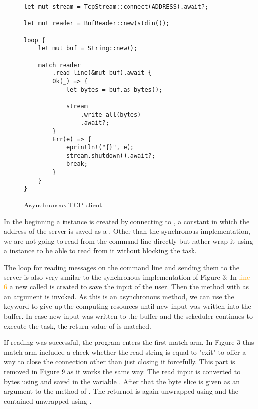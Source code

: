 \begin{figure}[ht]
    \begin{verbatim}
let mut stream = TcpStream::connect(ADDRESS).await?;

let mut reader = BufReader::new(stdin());

loop {
    let mut buf = String::new();

    match reader
        .read_line(&mut buf).await {
        Ok(_) => {
            let bytes = buf.as_bytes();

            stream
                .write_all(bytes)
                .await?;
        }
        Err(e) => {
            eprintln!("{}", e);
            stream.shutdown().await?;
            break;
        }
    }
}
    \end{verbatim}
    \caption{Asynchronous TCP client}
\end{figure}

In the beginning a  instance is created by connecting to , a constant in
which the address of the server is saved as a . Other than the synchronous implementation, we are not going
to read from the command line directly but rather wrap it using a  instance to be able to
read from it without blocking the task.

The loop for reading messages on the command line and sending them to the server is also very similar to the
synchronous implementation of Figure 3: In \textcolor{orange}{line 6} a new  called  is created
to save the input of the user. Then the  method with  as an argument is invoked. As this is
an asynchronous method, we can use the  keyword to give up the computing resources until new input was
written into the buffer. In case new input was written to the buffer and the scheduler continues to execute the task,
the return value of  is matched.

If reading was successful, the program enters the first match arm. In Figure 3 this match
arm included a check whether the read string is equal to "exit" to offer a way to close the connection other than just
closing it forcefully. This part is removed in Figure 9 as it works the same way. The read input is converted to bytes
using  and saved in the variable . After that the byte slice is given as an argument to the
 method of . The returned  is again unwrapped using  and the
contained  unwrapped using .

